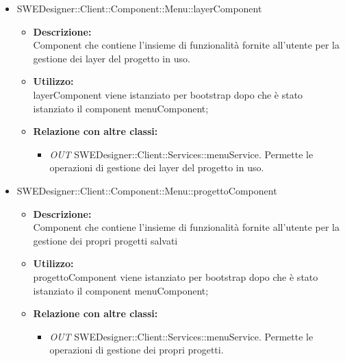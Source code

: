\begin{itemize}
\begin{itemize}
		\item SWEDesigner::Client::Component::Menu::layerComponent		
		\begin{itemize}
			\item \textbf{Descrizione:}\\
			Component che contiene l'insieme di funzionalità fornite all'utente per la gestione dei layer del progetto in uso.
			\item \textbf{Utilizzo:}\\
			layerComponent viene istanziato per bootstrap dopo che è stato istanziato il component menuComponent;
			\item \textbf{Relazione con altre classi:}\\
			\begin{itemize}
			\item \emph{OUT} SWEDesigner::Client::Services::menuService. Permette le operazioni di gestione dei layer del progetto in uso.
			\end{itemize}
		\end{itemize}
		
		\item SWEDesigner::Client::Component::Menu::progettoComponent		
		\begin{itemize}
			\item \textbf{Descrizione:}\\
			Component che contiene l'insieme di funzionalità fornite all'utente per la gestione dei propri progetti salvati
			\item \textbf{Utilizzo:}\\
			progettoComponent viene istanziato per bootstrap dopo che è stato istanziato il component menuComponent;
			\item \textbf{Relazione con altre classi:}\\
			\begin{itemize}
			\item \emph{OUT} SWEDesigner::Client::Services::menuService. Permette le operazioni di gestione dei propri progetti.
			\end{itemize}
		\end{itemize}
		

\end{itemize}
\end{itemize}
